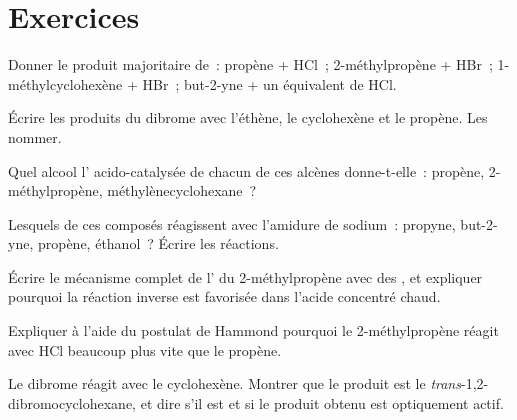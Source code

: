 \section{Exercices}

\begin{exercise}[$\star$]\label{exo:b1:electrophilic-additions:1}
Donner le produit majoritaire de~: propène + HCl~; 2-méthylpropène +
HBr~;
1-méthylcyclohexène + HBr~; but-2-yne + un équivalent de HCl.
\end{exercise}

\begin{exercise}[$\star$]\label{exo:b1:electrophilic-additions:2}
Écrire les produits du dibrome avec l'éthène, le cyclohexène et le
propène. Les nommer.
\end{exercise}

\begin{exercise}[$\star$]\label{exo:b1:electrophilic-additions:3}
Quel alcool l' acido-catalysée de chacun de ces alcènes
donne-t-elle~: propène, 2-méthylpropène, méthylènecyclohexane~?
\end{exercise}

\begin{exercise}[$\star$]\label{exo:b1:electrophilic-additions:4}
Lesquels de ces composés réagissent avec l'amidure de sodium~: propyne,
but-2-yne, propène, éthanol~? Écrire les réactions.
\end{exercise}

\begin{exercise}[$\star\star$]\label{exo:b1:electrophilic-additions:5}
Écrire le mécanisme complet de l' du 2-méthylpropène avec des
, et expliquer pourquoi la réaction inverse est favorisée
dans l'acide concentré chaud.
\end{exercise}

\begin{exercise}[$\star\star$]\label{exo:b1:electrophilic-additions:6}
Expliquer à l'aide du postulat de Hammond pourquoi le 2-méthylpropène
réagit avec HCl beaucoup plus vite que le propène.
\end{exercise}

\begin{exercise}[$\star\star$]\label{exo:b1:electrophilic-additions:7}
Le dibrome réagit avec le cyclohexène. Montrer que le produit est le
\textit{trans}-1,2-dibromocyclohexane, et dire s'il est  et si le
produit obtenu est optiquement actif.
\end{exercise}

